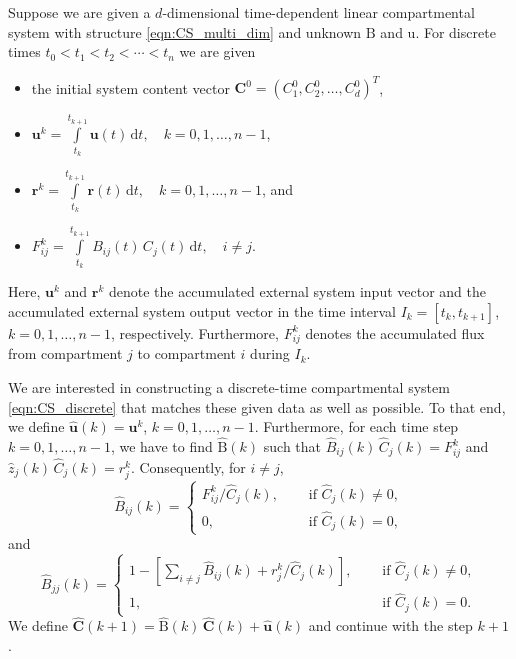 \documentclass[11pt,a4paper]{article}
\renewcommand{\vec}[1]{\mathbf{#1}}
\newcommand{\tens}[1]{\mathrm{#1}}
\newcommand{\dd}[1]{\,\mathrm{d}#1}
\newcommand{\intl}{\int\limits}
\newcommand{\suml}{\sum\limits}
\begin{document}
    Suppose we are given a $d$-dimensional time-dependent linear compartmental system with structure \eqref{eqn:CS_multi_dim} and unknown $\tens{B}$ and $\tens{u}$.
    For discrete times $t_0<t_1<t_2<\cdots<t_n$ we are given
    \begin{itemize}
        \item the initial system content vector $\vec{C}^0=(C^0_1,C^0_2,\ldots,C^0_d)^T$,
        \item $\vec{u}^k = \intl_{t_k}^{t_{k+1}} \vec{u}(t)\dd{t},\quad k=0,1,\ldots,n-1$, 
        \item $\vec{r}^k = \intl_{t_k}^{t_{k+1}} \vec{r}(t)\dd{t},\quad k=0,1,\ldots,n-1$, and
        \item $F_{ij}^k = \intl_{t_k}^{t_{k+1}} B_{ij}(t)\,C_j(t)\dd{t},\quad i\neq j$.
    \end{itemize}
    Here, $\vec{u}^k$ and $\vec{r}^k$ denote the accumulated external system input vector and the accumulated external system output vector in the time interval $I_k=[t_k,t_{k+1}]$, $k=0,1,\ldots,n-1$, respectively.
    Furthermore, $F^k_{ij}$ denotes the accumulated flux from compartment $j$ to compartment $i$ during $I_k$.

    We are interested in constructing a discrete-time compartmental system \eqref{eqn:CS_discrete} that matches these given data as well as possible.
    To that end, we define $\widehat{\vec{u}}(k)=\vec{u}^k$, $k=0,1,\ldots,n-1$.
    Furthermore, for each time step $k=0,1,\ldots,n-1$, we have to find $\widehat{\tens{B}}(k)$ such that $\widehat{B}_{ij}(k)\,\widehat{C}_j(k)=F^k_{ij}$ and $\widehat{z}_j(k)\,\widehat{C}_j(k)=r^k_j$.
    Consequently, for $i\neq j$,
    \begin{equation*}
        \widehat{B}_{ij}(k) =
        \begin{cases}
            F^k_{ij} / \widehat{C}_j(k),\quad&\text{ if }\widehat{C}_j(k)\neq0,\\
            0, &\text{ if }\widehat{C}_j(k)=0,
        \end{cases}
    \end{equation*}
    and
    \begin{equation*}
        \widehat{B}_{jj}(k) = 
        \begin{cases}
            1-\left[\suml_{i\neq j}\widehat{B}_{ij}(k)+r^k_j/\widehat{C}_j(k)\right],\quad &\text{ if }\widehat{C}_j(k)\neq0,\\
            1, &\text{ if }\widehat{C}_j(k)=0.
        \end{cases}
    \end{equation*}
    We define $\widehat{\vec{C}}(k+1)=\widehat{\tens{B}}(k)\,\widehat{\vec{C}}(k)+\widehat{\vec{u}}(k)$ and continue with the step $k+1$.
    
\end{document}
